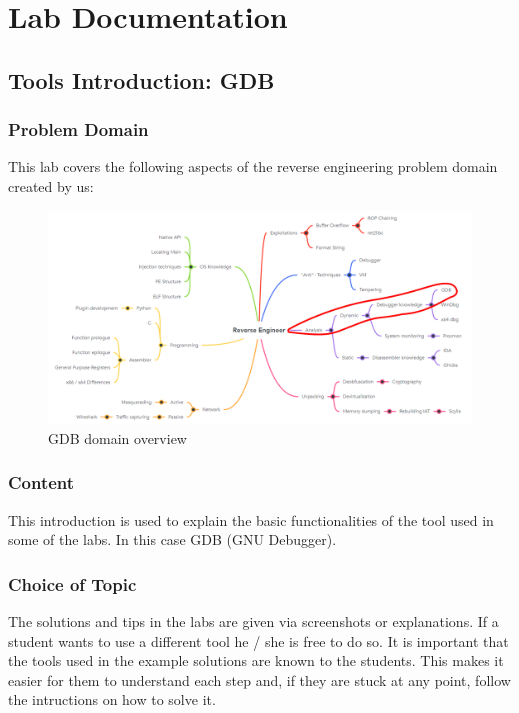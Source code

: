 \section{Lab Documentation}
\subsection{Tools Introduction: GDB}
\subsubsection*{Problem Domain}
This lab covers the following aspects of the reverse engineering problem domain created by us:
\vspace{-2ex}
\begin{figure}[H]
    \includegraphics[width=\textwidth]{resources/GDBIntro-overview-light.png}
    \caption{GDB domain overview}
    \label{fig:gdb-overview}
\end{figure}
\subsubsection*{Content}
This introduction is used to explain the basic functionalities of the tool used in some of the labs. In this case GDB (GNU Debugger).
\subsubsection*{Choice of Topic}
The solutions and tips in the labs are given via screenshots or explanations. If a student wants to use a different tool he / she is free to do so. It is important that the tools used in the example solutions are known to the students. This makes it easier for them to understand each step and, if they are stuck at any point, follow the intructions on how to solve it. 
